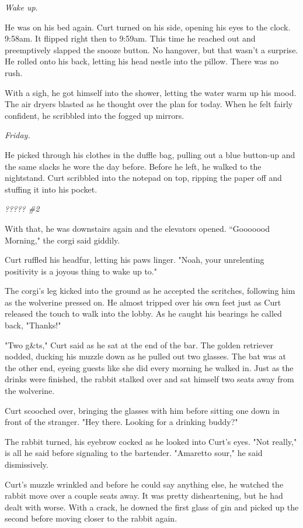 \emph{Wake up}.

He was on his bed again. Curt turned on his side, opening his eyes to the clock. 9:58am. It flipped right then to 9:59am. This time he reached out and preemptively slapped the snooze button. No hangover, but that wasn't a surprise. He rolled onto his back, letting his head nestle into the pillow. There was no rush.

With a sigh, he got himself into the shower, letting the water warm up his mood. The air dryers blasted as he thought over the plan for today. When he felt fairly confident, he scribbled into the fogged up mirrors.

\emph{Friday.}

He picked through his clothes in the duffle bag, pulling out a blue button-up and the same slacks he wore the day before. Before he left, he walked to the nightstand. Curt scribbled into the notepad on top, ripping the paper off and stuffing it into his pocket.

\emph{????? \#2}

With that, he was downstairs again and the elevators opened. ``Gooooood Morning," the corgi said giddily.

Curt ruffled his headfur, letting his paws linger. "Noah, your unrelenting positivity is a joyous thing to wake up to."

The corgi's leg kicked into the ground as he accepted the scritches, following him as the wolverine pressed on. He almost tripped over his own feet just as Curt released the touch to walk into the lobby. As he caught his bearings he called back, "Thanks!"

"Two g\&ts," Curt said as he sat at the end of the bar. The golden retriever nodded, ducking his muzzle down as he pulled out two glasses. The bat was at the other end, eyeing guests like she did every morning he walked in. Just as the drinks were finished, the rabbit stalked over and sat himself two seats away from the wolverine.

Curt scooched over, bringing the glasses with him before sitting one down in front of the stranger. "Hey there. Looking for a drinking buddy?"

The rabbit turned, his eyebrow cocked as he looked into Curt's eyes. "Not really," is all he said before signaling to the bartender. "Amaretto sour," he said dismissively.

Curt's muzzle wrinkled and before he could say anything else, he watched the rabbit move over a couple seats away. It was pretty disheartening, but he had dealt with worse. With a crack, he downed the first glass of gin and picked up the second before moving closer to the rabbit again.


